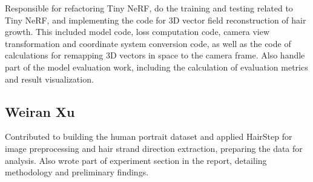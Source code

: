 \documentclass{article}
\begin{document}
Responsible for refactoring Tiny NeRF, do the training and testing related to Tiny NeRF, and implementing the code for 3D vector field reconstruction of hair growth. This included model code, loss computation code, camera view transformation and coordinate system conversion code, as well as the code of calculations for remapping 3D vectors in space to the camera frame. Also handle part of the model evaluation work, including the calculation of evaluation metrics and result visualization.

\subsection{Weiran Xu}

Contributed to building the human portrait dataset and applied HairStep for image preprocessing and hair strand direction extraction, preparing the data for analysis. Also wrote part of experiment section in the report, detailing methodology and preliminary findings.
\end{document}

